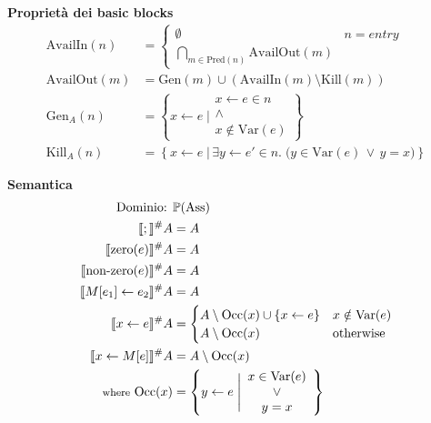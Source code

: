 \documentclass[a4paper,12pt,openany]{article}
\begin{document}
    \noindent\textbf{Proprietà dei basic blocks}
    \begin{align*}
        \mbox{AvailIn}(n) &=
        \begin{cases}
            \emptyset & n = entry\\
            \bigcap\limits_{m\in \mbox{Pred}(n)} \mbox{AvailOut}(m)
        \end{cases}\\
        \mbox{AvailOut}(m) &= \mbox{Gen}(m) \cup (\mbox{AvailIn}(m) \setminus \mbox{Kill}(m))\\
        \mbox{Gen}_A(n) &= \left\{
            x \leftarrow e \;\Bigg\vert
            \begin{array}{cc}
                x \leftarrow e \in n\\
                \land\\
                x \notin \mbox{Var}(e)
            \end{array}
        \right\}\\
        \mbox{Kill}_A(n) &= \left\{
            x \leftarrow e \;\big\vert\, \exists y \leftarrow e' \in n.\; \big( y \in \mbox{Var}(e) \,\lor\, y=x \big)
        \right\}
    \end{align*}
    
    \noindent\textbf{Semantica}
    \begin{align*}
        \mbox{Dominio: }& \mathbb{P}(\mbox{Ass})\\
        \llbracket ; \rrbracket^\#A &= A\\
        \llbracket \mbox{zero}(e) \rrbracket^\#A &= A\\
        \llbracket \mbox{non-zero}(e) \rrbracket^\#A &= A\\
        \llbracket M[e_1]\leftarrow e_2 \rrbracket^\#A &= A\\
        \llbracket x \leftarrow e \rrbracket^\#A &=
        \begin{cases}
            A \setminus \mbox{Occ}(x) \cup \{x\leftarrow e\} & x\notin \mbox{Var}(e)\\
            A \setminus \mbox{Occ}(x) & \mbox{otherwise}
        \end{cases}\\
        \llbracket x\leftarrow M[e] \rrbracket^\#A &= A\setminus \mbox{Occ}(x)\\
        \mbox{{\footnotesize where} Occ}(x) &=
        \left\{
            y\leftarrow e \;\Bigg\vert
            \begin{array}{cc}
                x \in \mbox{Var}(e)\\
                \lor\\
                y=x
            \end{array}
        \right\}
    \end{align*}
    
\end{document}
